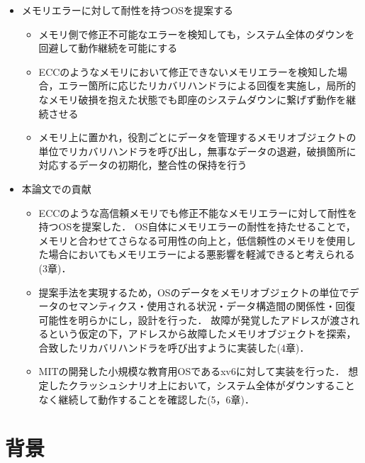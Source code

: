 \documentclass[10.5ptj,a4j]{ltjsarticle}
\providecommand{\tightlist}{%
  \setlength{\itemsep}{0pt}\setlength{\parskip}{0pt}}
\begin{document}
\begin{itemize}
  \item メモリエラーに対して耐性を持つOSを提案する
  \begin{itemize}\tightlist{}
    \item メモリ側で修正不可能なエラーを検知しても，システム全体のダウンを回避して動作継続を可能にする
    \item ECCのようなメモリにおいて修正できないメモリエラーを検知した場合，エラー箇所に応じたリカバリハンドラによる回復を実施し，局所的なメモリ破損を抱えた状態でも即座のシステムダウンに繋げず動作を継続させる
    \item メモリ上に置かれ，役割ごとにデータを管理するメモリオブジェクトの単位でリカバリハンドラを呼び出し，無事なデータの退避，破損箇所に対応するデータの初期化，整合性の保持を行う
  \end{itemize}

  \item 本論文での貢献
  \begin{itemize}\tightlist{}
    \item ECCのような高信頼メモリでも修正不能なメモリエラーに対して耐性を持つOSを提案した．
          OS自体にメモリエラーの耐性を持たせることで，メモリと合わせてさらなる可用性の向上と，低信頼性のメモリを使用した場合においてもメモリエラーによる悪影響を軽減できると考えられる(3章)．
    \item 提案手法を実現するため，OSのデータをメモリオブジェクトの単位でデータのセマンティクス・使用される状況・データ構造間の関係性・回復可能性を明らかにし，設計を行った．
	  故障が発覚したアドレスが渡されるという仮定の下，アドレスから故障したメモリオブジェクトを探索，合致したリカバリハンドラを呼び出すように実装した(4章)．
    \item MITの開発した小規模な教育用OSであるxv6に対して実装を行った．
	  想定したクラッシュシナリオ上において，システム全体がダウンすることなく継続して動作することを確認した(5，6章)．
  \end{itemize}
\end{itemize}


\section{背景}
\end{document}
